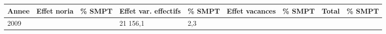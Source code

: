\begin{longtable}[]{@{}lllllllll@{}}
\toprule
\begin{minipage}[b]{0.05\columnwidth}\raggedright
Annee\strut
\end{minipage} & \begin{minipage}[b]{0.10\columnwidth}\raggedright
Effet noria\strut
\end{minipage} & \begin{minipage}[b]{0.06\columnwidth}\raggedright
\% SMPT\strut
\end{minipage} & \begin{minipage}[b]{0.17\columnwidth}\raggedright
Effet var. effectifs\strut
\end{minipage} & \begin{minipage}[b]{0.06\columnwidth}\raggedright
\% SMPT\strut
\end{minipage} & \begin{minipage}[b]{0.13\columnwidth}\raggedright
Effet vacances\strut
\end{minipage} & \begin{minipage}[b]{0.06\columnwidth}\raggedright
\% SMPT\strut
\end{minipage} & \begin{minipage}[b]{0.05\columnwidth}\raggedright
Total\strut
\end{minipage} & \begin{minipage}[b]{0.06\columnwidth}\raggedright
\% SMPT\strut
\end{minipage}\tabularnewline
\midrule
\endhead
\begin{minipage}[t]{0.05\columnwidth}\raggedright
2009\strut
\end{minipage} & \begin{minipage}[t]{0.10\columnwidth}\raggedright
\strut
\end{minipage} & \begin{minipage}[t]{0.06\columnwidth}\raggedright
\strut
\end{minipage} & \begin{minipage}[t]{0.17\columnwidth}\raggedright
21 156,1\strut
\end{minipage} & \begin{minipage}[t]{0.06\columnwidth}\raggedright
2,3\strut
\end{minipage} & \begin{minipage}[t]{0.13\columnwidth}\raggedright
\strut
\end{minipage} & \begin{minipage}[t]{0.06\columnwidth}\raggedright

\end{minipage}
\end{longtable}
